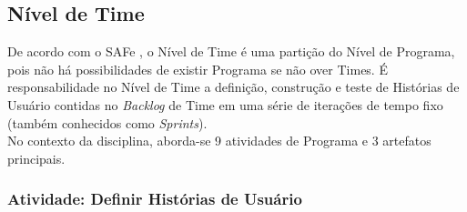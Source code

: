 		\subsection[Nível de Time]{Nível de Time}
		\label{subsec:processo_atividade_time}
			De acordo com o SAFe \cite{safe}, o Nível de Time é uma partição do Nível de Programa, pois não há possibilidades de existir Programa se não over Times. É responsabilidade no Nível de Time a definição, construção e teste de Histórias de Usuário contidas no \emph{Backlog} de Time em uma série de iterações de tempo fixo (também conhecidos como \emph{Sprints}).
			\\ \indent No contexto da disciplina, aborda-se 9 atividades de Programa e 3 artefatos principais.

			\subsubsection[Atividade: Definir Histórias de Usuário]{Atividade: Definir Histórias de Usuário}
			\label{subsubsec:processo_atividade_time_definir_us}
